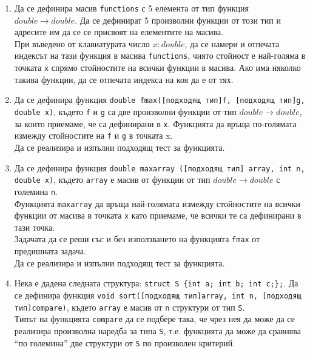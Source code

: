 {\begin{enumerate}[resume]
	\item Да се дефинира масив \texttt{functions} с 5 елемента от тип функция $double \rightarrow double$. Да се дефинират 5 произволни функции от този тип и адресите им да се се присвоят на елементите на масива.\\

	При въведено от клавиатурата число $x:double$, да се намери и отпечата индексът на тази функция в масива \texttt{functions}, чиято стойност е най-голяма в точката \texttt{x} спрямо стойностите на всички функции в масива. Ако има няколко такива функции, да се отпечата индекса на коя да е от тях.

	\item Да се дефинира функция \texttt{double fmax([подходящ тип]f, [подходящ тип]g, double x)}, където \texttt{f} и \texttt{g} са две произволни функции от тип $double \rightarrow double$, за които приемаме, че са дефинирани в \texttt{x}.  Функцията да връща по-голямата измежду стойностите на \texttt{f} и \texttt{g} в точката x.\\

	Да се реализира и изпълни подходящ тест за функцията.

	\item Да се дефинира функция \texttt{double maxarray ([подходящ тип] array, int n, double x)}, където \texttt{array} е масив от функции от тип $double \rightarrow double$ с големина \texttt{n}. \\

	Функцията \texttt{maxarray} да връща най-голямата измежду стойностите на всички функции от масива в точката \texttt{x} като приемаме, че всички те са дефинирани в тази точка.\\

	Задачата да се реши със и без използването на функцията \texttt{fmax} от предишната задача.\\

	Да се реализира и изпълни подходящ тест за функцията.

	\item Нека е дадена следната структура: \texttt{struct S \{int a; int b; int c;\};}. Да се дефинира функция \texttt{void sort([подходящ тип]array, int n, [подходящ тип]compare)}, където \texttt{array} е масив от \texttt{n} структури от тип \texttt{S}.\\

	Типът на функцията \texttt{compare} да се подбере така, че чрез нея да може да се реализира произволна наредба за типа \texttt{S}, т.е. функцията да може да сравнява ``по големина'' две структури от \texttt{S} по произволен критерий.\\


\end{enumerate}}
